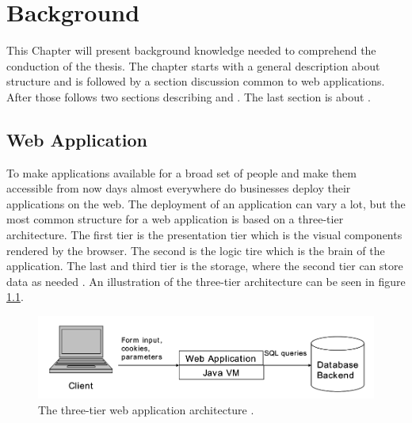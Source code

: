 \chapter{Background}
This Chapter will present background knowledge needed to comprehend the conduction of the thesis. The chapter starts with a general description about \textit{} structure and is followed by a section discussion common \textit{} to web applications. After those follows two sections describing \textit{} and \textit{}. The last section is about \textit{}.



\section{Web Application}
\label{WebApplication}
To make applications available for a broad set of people and make them accessible from now days almost everywhere do businesses deploy their applications on the web. The deployment of an application can vary a lot, but the most common structure for a web application is based on a three-tier architecture. The first tier is the presentation tier which is the visual components rendered by the browser. The second is the logic tire which is the brain of the application. The last and third tier is the storage, where the second tier can store data as needed \parencite{JustinClarke-Salt2009SIAa}. An illustration of the three-tier architecture can be seen in figure \ref{fig:webApplication-Haldar}.

\begin{figure}
    \centering
    \includegraphics[width=\textwidth]{images/webApplication-Haldar.png}
    \caption{The three-tier web application architecture \cite{Haldar}.}
    \label{fig:webApplication-Haldar}
\end{figure}

